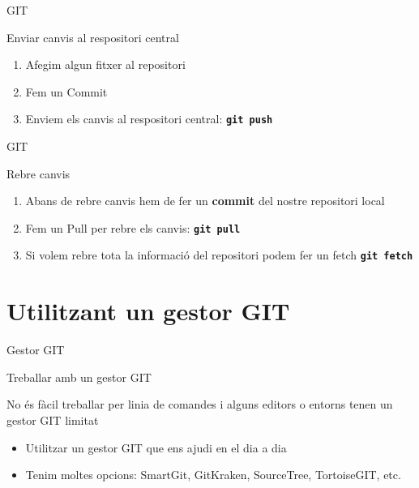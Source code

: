 \documentclass[10pt,xcolor={rgb}]{beamer}
\begin{document}
    \begin{frame}[fragile]{GIT}
      \begin{block}{Enviar canvis al respositori central}

        \begin{enumerate}
          \item Afegim algun fitxer al repositori
          \item Fem un Commit
          \item Enviem els canvis al respositori central: \texttt{\textbf{git push}}
        \end{enumerate}

      \end{block}
    \end{frame}

    \begin{frame}[fragile]{GIT}
      \begin{block}{Rebre canvis}

        \begin{enumerate}
          \item Abans de rebre canvis hem de fer un \textbf{commit} del nostre repositori local  
          \item Fem un Pull per rebre els canvis: \texttt{\textbf{git pull}}
          \item Si volem rebre tota la informació del repositori podem fer un fetch \texttt{\textbf{git fetch}}
        \end{enumerate}

      \end{block}
    \end{frame}




    \section{Utilitzant un gestor GIT}
    
    \begin{frame}[fragile]{Gestor GIT}
      \begin{block}{Treballar amb un gestor GIT}

        No és fàcil treballar per linia de comandes i alguns editors o entorns tenen un gestor GIT limitat
        \begin{itemize}
          \item Utilitzar un gestor GIT que ens ajudi en el dia a dia
          \item Tenim moltes opcions:  SmartGit, GitKraken, SourceTree, TortoiseGIT, etc.
        \end{itemize}

      \end{block}
    \end{frame}
\end{document}
